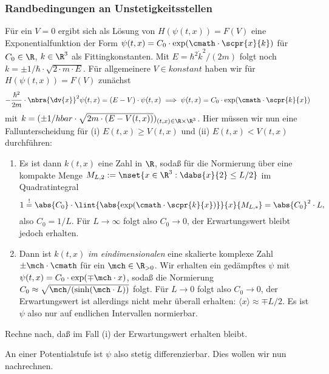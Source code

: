 \documentclass{subfiles}
\begin{document}
    \subsubsection*{Randbedingungen an Unstetigkeitsstellen}
        Für ein $V=0$ ergibt sich als Lösung von $H(\psi(t,x)) = F(V)$ eine Exponentialfunktion der Form $\psi(t,x) = C_0\cdot\exp(\cmath\cdot\scpr{x}{k})$ für $C_0\in\R$, $k\in\R^3$ als Fittingkonstanten. Mit $E = \hbar^2\dot k^2/(2m)$ folgt noch $k = \pm 1/\hbar\cdot\sqrt{2\cdot m\cdot E}$. Für allgemeinere $V\in\textit{konstant}$ haben wir für $H(\psi(t,x)) = F(V)$ zunächst 
        \[-\frac{\hbar^2}{2m}\cdot\nbra{\dv{x}}^2\psi(t,x) = (E-V)\cdot\psi(t,x)\implies \psi(t,x) = C_0\cdot\exp(\cmath\cdot\scpr{k}{x})\]
        mit $k = (\pm 1/hbar\cdot\sqrt{2m\cdot (E-V(t,x))})_{(t,x)\in\R\times\R^3}$. Hier müssen wir nun eine Fallunterscheidung für (i) $E(t,x)\geq V(t,x)$ und (ii) $E(t,x)<V(t,x)$ durchführen:
        \begin{enumerate}[label=(\roman*)]
            \item Es ist dann $k(t,x)$ eine Zahl in $\R$, sodaß für die Normierung über eine kompakte Menge $M_{L,2}:=\nset{x\in\R^3:\dabs{x}{2} \leq L/2}$ im Quadratintegral 
            \[1 \stackrel{!}{=} \abs{C_0}\cdot\lint{\abs{\exp(\cmath\cdot\scpr{k}{x})}}{x}{M_{L,s}} = \abs{C_0}^2\cdot L,\]
            also $C_0 = 1/L$. Für $L\to\infty$ folgt also $C_0\to 0$, der Erwartungswert bleibt jedoch erhalten. 
            \item Dann ist $k(t,x)$ \emph{im eindimensionalen} eine skalierte komplexe Zahl $\pm\mch\cdot\cmath$ für ein $\mch\in\R_{>0}$. Wir erhalten ein gedämpftes $\psi$ mit $\psi(t,x) = C_0\cdot\exp(\mp\mch\cdot x)$, sodaß die Normierung $C_0\approx\sqrt{\mch/(\sinh(\mch\cdot L))}$ folgt. Für $L\to 0$ folgt also $C_0\to 0$, der Erwartungswert ist allerdings nicht mehr überall erhalten: $\langle x\rangle\approx \mp L/2$. Es ist $\psi$ also nur auf endlichen Intervallen normierbar.
        \end{enumerate}
        \begin{Aufgabe}
            \nr{} Rechne nach, daß im Fall (i) der Erwartungswert erhalten bleibt. 
        \end{Aufgabe}
        An einer Potentialstufe ist $\psi$ also stetig differenzierbar. Dies wollen wir nun nachrechnen.
        
\end{document}
